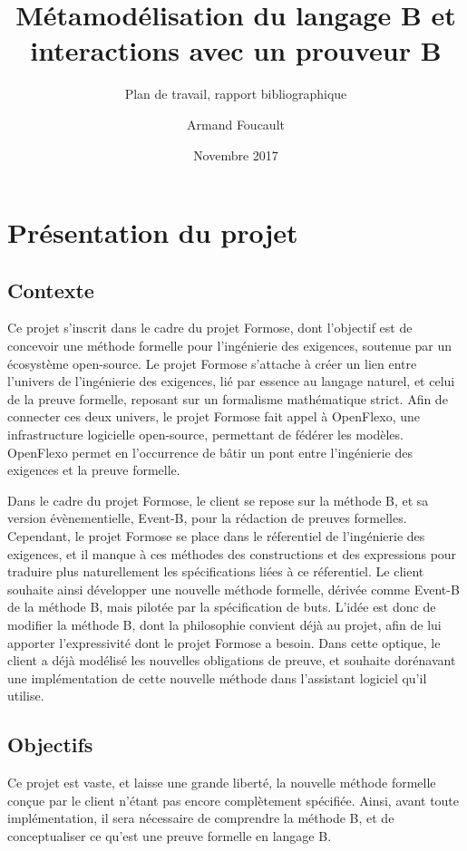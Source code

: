 \documentclass{article}
\author{Armand Foucault}
\date{Novembre 2017}
\title{Métamodélisation du langage B et \mbox{interactions} avec un prouveur B}
\subtitle{Plan de travail, rapport bibliographique}
\begin{document}
\imtaMaketitlepage

\tableofcontents

\newpage


\section{Présentation du projet}

\subsection{Contexte}

Ce projet s'inscrit dans le cadre du projet Formose, dont l'objectif est de concevoir une méthode formelle pour l'ingénierie %
des exigences, soutenue par un écosystème open-source.
Le projet Formose s'attache à créer un lien entre l'univers de l'ingénierie des exigences, lié par essence au langage naturel, %
et celui de la preuve formelle, reposant sur un formalisme mathématique strict.
Afin de connecter ces deux univers, le projet Formose fait appel à OpenFlexo, une infrastructure logicielle open-source, permettant de fédérer les modèles.
OpenFlexo permet en l'occurrence de bâtir un pont entre l'ingénierie des exigences et la preuve formelle.

Dans le cadre du projet Formose, le client se repose sur la méthode B, et sa version évènementielle, Event-B, pour la rédaction de preuves formelles.
Cependant, le projet Formose se place dans le réferentiel de l'ingénierie des exigences, et il manque à ces méthodes des constructions et des expressions %
pour traduire plus naturellement les spécifications liées à ce réferentiel.
Le client souhaite ainsi développer une nouvelle méthode formelle, dérivée comme Event-B de la méthode B, mais pilotée par la spécification de buts.
L'idée est donc de modifier la méthode B, dont la philosophie convient déjà au projet, afin de lui apporter l'expressivité dont le projet Formose a besoin.
Dans cette optique, le client a déjà modélisé les nouvelles obligations de preuve, et souhaite dorénavant une implémentation de cette nouvelle méthode dans l'assistant logiciel qu'il utilise.

\subsection{Objectifs}

Ce projet est vaste, et laisse une grande liberté, la nouvelle méthode formelle conçue par le client n'étant pas encore complètement spécifiée.
Ainsi, avant toute implémentation, il sera nécessaire de comprendre la méthode B, et de conceptualiser ce qu'est une preuve formelle en langage B.
\end{document}
